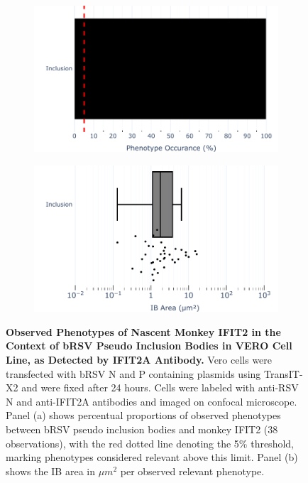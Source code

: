 \begin{figure}
    \begin{subfigure}{0.495\textwidth}
        \caption{}
        \includegraphics[width=1\linewidth]{08. Chapter 3/Figs/03. pIB/03. IFIT2/02. IFIT2A/07. bar_i2a_vero_bnbp.pdf} 
    \end{subfigure}
    \begin{subfigure}{0.495\textwidth}
        \caption{}
        \includegraphics[width=1\linewidth]{08. Chapter 3/Figs/03. pIB/03. IFIT2/02. IFIT2A/08. box_i2a_vero_bnbp.pdf}
    \end{subfigure}
    \caption[Observed Phenotypes of Nascent Monkey IFIT2 in the Context of bRSV Pseudo Inclusion Bodies in VERO Cell Line, as Detected by IFIT2A Antibody.]{\textbf{Observed Phenotypes of Nascent Monkey IFIT2 in the Context of bRSV Pseudo Inclusion Bodies in VERO Cell Line, as Detected by IFIT2A Antibody.} Vero cells were transfected with bRSV N and P containing plasmids using TransIT-X2 and were fixed after 24 hours. Cells were labeled with anti-RSV N and anti-IFIT2A antibodies and imaged on confocal microscope. Panel (a) shows percentual proportions of observed phenotypes between bRSV pseudo inclusion bodies and monkey IFIT2 (38 observations), with the red dotted line denoting the 5\% threshold, marking phenotypes considered relevant above this limit. Panel (b) shows the IB area in \(\mu m^2\) per observed relevant phenotype.}
    \label{fig:Observed Phenotypes of Nascent Monkey IFIT2 in the Context of bRSV Pseudo Inclusion Bodies in VERO Cell Line, as Detected by IFIT2A Antibody}
\end{figure}

